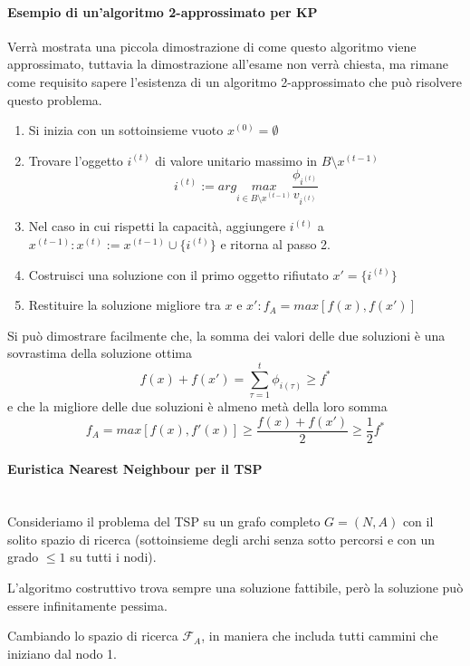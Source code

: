\documentclass{article}
\begin{document}
    \paragraph{Esempio di un'algoritmo 2-approssimato per KP}\mbox{}
    Verrà mostrata una piccola dimostrazione di come questo algoritmo viene approssimato, tuttavia la dimostrazione
    all'esame non verrà chiesta, ma rimane come requisito sapere l'esistenza di un algoritmo 2-approssimato che può
    risolvere questo problema.

    \begin{enumerate}
        \item Si inizia con un sottoinsieme vuoto $x^{(0)}=\emptyset$
        \item Trovare l'oggetto $i^{(t)}$ di valore unitario massimo in $B\setminus x^{(t-1)}$
              $$i^{(t)}:=arg\underset{i\in B\setminus x^{(t-1)}}{max}\frac{\phi_{i^{(t)}}}{v_{i^{(t)}}}$$
        \item Nel caso in cui rispetti la capacità, aggiungere $i^{(t)}$ a $x^{(t-1)}:x^{(t)}:=x^{(t-1)}\cup\{i^{(t)}\}$
              e ritorna al passo 2.
        \item Costruisci una soluzione con il primo oggetto rifiutato $x'=\{i^{(t)}\}$
        \item Restituire la soluzione migliore tra $x$ e $x':f_A=max[f(x),f(x')]$

    \end{enumerate}

    Si può dimostrare facilmente che, la somma dei valori delle due soluzioni è una sovrastima
    della soluzione ottima
    $$f(x)+f(x')=\sum_{\tau =1}^t \phi_{i(\tau)}\geq f^*$$
    e che la migliore delle due soluzioni è almeno metà della loro somma
    $$f_A = max[f(x),f'(x)]\geq\frac{f(x)+f(x')}{2}\geq\frac{1}{2}f^*$$

    \paragraph{Euristica Nearest Neighbour per il TSP}\mbox{}\\
    Consideriamo il problema del TSP su un grafo completo $G=(N,A)$ con il solito spazio di ricerca
    (sottoinsieme degli archi senza sotto percorsi e con un grado $\leq 1$ su tutti i nodi).

    L'algoritmo costruttivo trova sempre una soluzione fattibile, però la soluzione può essere
    infinitamente pessima.

    Cambiando lo spazio di ricerca $\mathcal{F}_A$, in maniera che includa tutti cammini che iniziano
    dal nodo 1.
\end{document}
